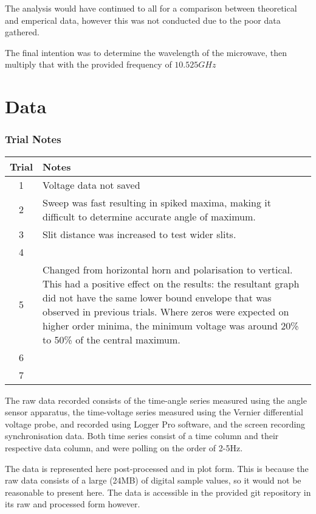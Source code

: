 The analysis would have continued to all for a comparison between theoretical and emperical data, however this was not conducted due to the poor data gathered.

The final intention was to determine the wavelength of the microwave, then multiply that with the provided frequency of $10.525 GHz$

\section*{Data}

\subsubsection*{Trial Notes}
\begin{center}
\begin{tabularx}{\linewidth}{ |c | X| }
 \hline
 Trial & Notes \\ 
\hline
 1 & Voltage data not saved \\ 
 2 & Sweep was fast resulting in spiked maxima, making it difficult to determine accurate angle of maximum. \\ 
 3 & Slit distance was increased to test wider slits. \\ 
 4 &  \\ 
 5 & Changed from horizontal horn and polarisation to vertical. This had a positive effect on the results: the resultant graph did not have the same lower bound envelope that was observed in previous trials. Where zeros were expected on higher order minima, the minimum voltage was around 20\% to 50\% of the central maximum. \\ 
 6 &  \\ 
 7 &  \\ 
 \hline
\end{tabularx}
\end{center}

The raw data recorded consists of the time-angle series measured using the angle sensor apparatus, the time-voltage series measured using the Vernier differential voltage probe, and recorded using Logger Pro software, and the screen recording synchronisation data. Both time series consist of a time column and their respective data column, and were polling on the order of 2-5Hz.

The data is represented here post-processed and in plot form. This is because the raw data consists of a large (24MB) of digital sample values, so it would not be reasonable to present here. The data is accessible in the provided git repository in its raw and processed form however.

